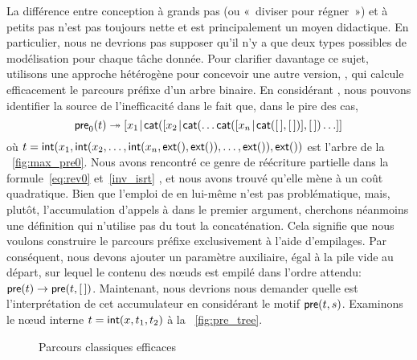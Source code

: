 La différence entre conception à grands pas (ou «~diviser pour régner~») et à
petits pas n'est pas toujours nette et
est principalement un moyen didactique. En particulier, nous ne
devrions pas supposer qu'il n'y a que deux types possibles de
modélisation pour chaque tâche donnée. Pour clarifier davantage ce
sujet, utilisons une approche hétérogène pour concevoir une autre
version, , qui calcule efficacement
le parcours préfixe d'un arbre binaire. En considérant
, nous pouvons
identifier la source de l'inefficacité dans le fait que, dans le pire
des cas,
\begin{equation*}
\fun{pre}_0(t) \twoheadrightarrow
\cons{x_1}{\fun{cat}(\cons{x_2}{\fun{cat}(\dots
    \fun{cat}(\cons{x_n}{\fun{cat}(\el, \el)},\el) \dots}}
\index{cat@\fun{cat/2}}
\end{equation*}
où \(t = \textsf{int}(x_1,\textsf{int}(x_2,\dots, \textsf{int}(x_n,
\textsf{ext}(), \textsf{ext}()), \dots, \textsf{ext}()),\textsf{ext}())\) est
l'arbre de la \fig~\vref{fig:max_pre0}. Nous avons rencontré ce genre
de réécriture partielle dans la
formule~\eqref{eq:rev0}
 et~\eqref{inv_isrt}
,
et nous avons trouvé qu'elle mène à un coût quadratique. Bien que
l'emploi de  en lui-même n'est pas
problématique, mais, plutôt, l'accumulation d'appels à
 dans le premier argument, cherchons
néanmoins une définition qui n'utilise pas du tout la concaténation.
Cela signifie que nous voulons construire le parcours préfixe
exclusivement à l'aide d'empilages. Par conséquent, nous devons
ajouter un paramètre auxiliaire, égal à la pile vide au départ, sur
lequel le contenu des nœuds est empilé dans l'ordre attendu:
\(\textsf{pre}(t) \rightarrow \textsf{pre}(t,[\,])\).
Maintenant, nous devrions nous demander quelle est l'interprétation de
cet accumulateur en
considérant le motif \(\textsf{pre}(t,s)\). Examinons le nœud interne
\(t=\textsf{int}(x,t_1,t_2)\) à la \fig~\vref{fig:pre_tree}.
\begin{figure}
\centering
{}
\caption{Parcours classiques efficaces}
\label{fig:classic_walks}
\end{figure}
